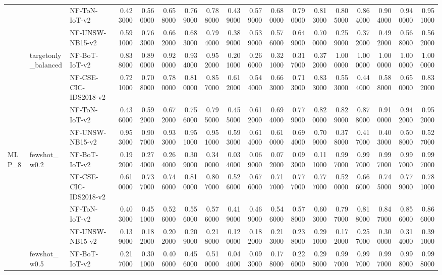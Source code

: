 \begin{tabular}{lllrrrrrrrrrrrrrrr}
 &  & NF-ToN-IoT-v2 & 0.423000 & 0.560000 & 0.658000 & 0.769000 & 0.788000 & 0.439000 & 0.579000 & 0.680000 & 0.790000 & 0.813000 & 0.805000 & 0.864000 & 0.904000 & 0.940000 & 0.951000 \\
 &  & NF-UNSW-NB15-v2 & 0.591000 & 0.763000 & 0.662000 & 0.683000 & 0.794000 & 0.389000 & 0.539000 & 0.576000 & 0.649000 & 0.700000 & 0.259000 & 0.372000 & 0.492000 & 0.568000 & 0.562000 \\
\cline{2-18}
 & \multirow[t]{4}{*}{targetonly_balanced} & NF-BoT-IoT-v2 & 0.838000 & 0.890000 & 0.920000 & 0.934000 & 0.952000 & 0.201000 & 0.266000 & 0.321000 & 0.317000 & 0.372000 & 1.000000 & 1.000000 & 1.000000 & 1.000000 & 1.000000 \\
 &  & NF-CSE-CIC-IDS2018-v2 & 0.721000 & 0.708000 & 0.780000 & 0.810000 & 0.857000 & 0.612000 & 0.544000 & 0.663000 & 0.713000 & 0.833000 & 0.553000 & 0.444000 & 0.588000 & 0.650000 & 0.832000 \\
 &  & NF-ToN-IoT-v2 & 0.436000 & 0.592000 & 0.672000 & 0.756000 & 0.795000 & 0.455000 & 0.612000 & 0.694000 & 0.779000 & 0.820000 & 0.829000 & 0.878000 & 0.910000 & 0.942000 & 0.952000 \\
 &  & NF-UNSW-NB15-v2 & 0.953000 & 0.907000 & 0.933000 & 0.951000 & 0.951000 & 0.593000 & 0.614000 & 0.610000 & 0.694000 & 0.709000 & 0.378000 & 0.417000 & 0.403000 & 0.508000 & 0.527000 \\
\cline{1-18} \cline{2-18}
\multirow[t]{24}{*}{MLP_8} & \multirow[t]{4}{*}{fewshot_w0.2} & NF-BoT-IoT-v2 & 0.192000 & 0.274000 & 0.264000 & 0.309000 & 0.340000 & 0.034000 & 0.069000 & 0.072000 & 0.093000 & 0.111000 & 0.997000 & 0.997000 & 0.997000 & 0.997000 & 0.997000 \\
 &  & NF-CSE-CIC-IDS2018-v2 & 0.610000 & 0.737000 & 0.746000 & 0.810000 & 0.807000 & 0.526000 & 0.676000 & 0.717000 & 0.777000 & 0.777000 & 0.520000 & 0.666000 & 0.745000 & 0.779000 & 0.781000 \\
 &  & NF-ToN-IoT-v2 & 0.403000 & 0.451000 & 0.526000 & 0.556000 & 0.576000 & 0.419000 & 0.469000 & 0.546000 & 0.578000 & 0.603000 & 0.797000 & 0.818000 & 0.847000 & 0.856000 & 0.866000 \\
 &  & NF-UNSW-NB15-v2 & 0.139000 & 0.182000 & 0.202000 & 0.209000 & 0.218000 & 0.120000 & 0.182000 & 0.213000 & 0.238000 & 0.291000 & 0.172000 & 0.257000 & 0.300000 & 0.314000 & 0.391000 \\
\cline{2-18}
 & \multirow[t]{4}{*}{fewshot_w0.5} & NF-BoT-IoT-v2 & 0.217000 & 0.301000 & 0.406000 & 0.456000 & 0.510000 & 0.044000 & 0.093000 & 0.178000 & 0.226000 & 0.298000 & 0.997000 & 0.997000 & 0.997000 & 0.998000 & 0.998000 \\

\end{tabular}
